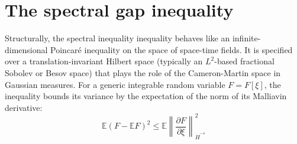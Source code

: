 \section{The spectral gap inequality}

Structurally, the spectral inequality inequality behaves like an infinite-dimensional Poincaré inequality on the space of space-time fields. It is specified over a translation-invariant Hilbert space (typically an $L^2$-based fractional Sobolev or Besov space) that plays the role of the Cameron-Martin space in Gaussian measures. 
For a generic integrable random variable $F = F[\xi]$, the inequality bounds its variance by the expectation of the norm of its Malliavin derivative:
\begin{equation}
\mathbb{E}(F - \mathbb{E}F)^2 \le \mathbb{E}\left\| \frac{\partial F}{\partial \xi} \right\|^{2}_{\dot{H}^{-s}}
\end{equation}

